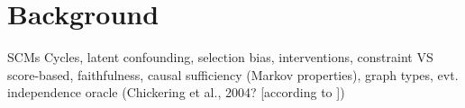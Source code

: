 \section*{Background}
SCMs
Cycles, latent confounding, selection bias, interventions, constraint VS score-based, faithfulness, causal sufficiency (Markov properties), graph types, evt. independence oracle (Chickering et al., 2004? [according to \citeauthor{claassen2013learning}])